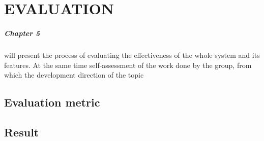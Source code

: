 \chapter{EVALUATION}
\label{conclusion}
\paragraph{Chapter 5}will present the process of evaluating the effectiveness of the whole system and its features. At the same time self-assessment of the work done by the group, from which the development direction of the topic

\section{Evaluation metric}
\section{Result}

